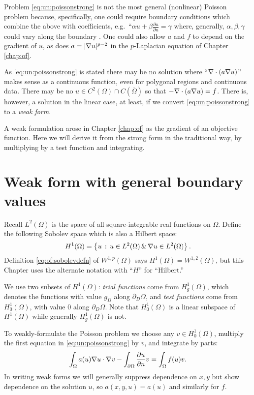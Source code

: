 Problem \eqref{eq:un:poissonstrong} is not the most general (nonlinear) Poisson problem because, specifically, one could require boundary conditions which combine the above with coefficients, e.g.~``$\alpha u + \beta \frac{\partial u}{\partial n} = \gamma$ where, generally, $\alpha,\beta,\gamma$ could vary along the boundary \citep{Elmanetal2005}.  One could also allow $a$ and $f$ to depend on the gradient of $u$, as does $a=|\nabla u|^{p-2}$ in the $p$-Laplacian equation of Chapter \ref{chap:of}.

As \eqref{eq:un:poissonstrong} is stated there may be no solution where ``$\nabla\cdot(a\nabla u)$'' makes sense as a continuous function, even for polygonal regions and continuous data.  There may be no $u\in C^2(\Omega) \cap C(\overline \Omega)$ so that $-\nabla\cdot(a\nabla u) = f$.  There is, however, a solution in the linear case, at least, if we convert \eqref{eq:un:poissonstrong} to a \emph{weak form}.

A weak formulation arose in Chapter \ref{chap:of} as the gradient of an objective function.  Here we will derive it from the strong form in the traditional way, by multiplying by a test function and integrating.

\section{Weak form with general boundary values}

Recall $L^2(\Omega)$ is the space of all square-integrable real functions on $\Omega$.  Define the following Sobolev space \citep{Evans2010} which is also a Hilbert space:
    $$H^1(\Omega) = \left\{u \,:\, u \in L^2(\Omega) \,\&\, \nabla u \in L^2(\Omega)\right\}.$$
Definition \eqref{eq:of:sobolevdefn} of $W^{1,p}(\Omega)$ says $H^1(\Omega) = W^{1,2}(\Omega)$, but this Chapter uses the alternate notation with ``$H$'' for ``Hilbert.''

We use two subsets of $H^1(\Omega)$: \emph{trial functions} come from $H_{g}^1(\Omega)$, which denotes the functions with value $g_D$ along $\partial_D \Omega$, and \emph{test functions} come from $H_{0}^1(\Omega)$, with value $0$ along $\partial_D \Omega$.  Note that $H_{0}^1(\Omega)$ is a linear subspace of $H^1(\Omega)$ while generally $H_{g}^1(\Omega)$ is not.

To weakly-formulate the Poisson problem we choose any $v\in H_{0}^1(\Omega)$, multiply the first equation in \eqref{eq:un:poissonstrong} by $v$, and integrate by parts:
\begin{equation*}
\int_\Omega a(u) \nabla u \cdot \nabla v - \int_{\partial\Omega} \frac{\partial u}{\partial n} v = \int_\Omega f(u) v.
\end{equation*}
In writing weak forms we will generally suppress dependence on $x,y$ but show dependence on the solution $u$, so $a(x,y,u)=a(u)$ and similarly for $f$.

